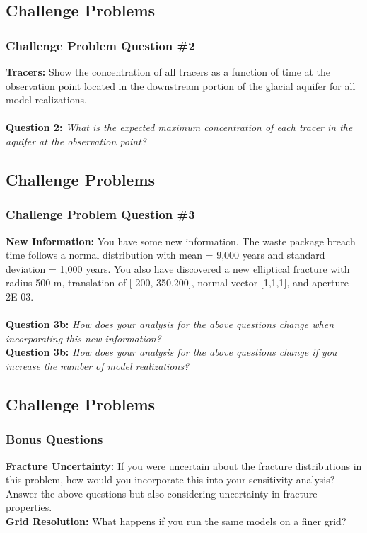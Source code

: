 \documentclass{beamer}
\begin{document}
\subsection{Challenge Problems}

\begin{frame}[fragile]\frametitle{Challenge Problem Question \#2}
	
	\textbf{Tracers:} Show the concentration of all tracers as a function of time at the observation point located in the downstream portion of the glacial aquifer for all model realizations.  \\
	\textbf{    }\\
	\textbf{Question 2: }\textit{What is the expected maximum concentration of each tracer in the aquifer at the observation point?}
	
\end{frame}

\subsection{Challenge Problems}

\begin{frame}[fragile]\frametitle{Challenge Problem Question \#3}
	\textbf{New Information:} You have some new information. The waste package breach time follows a normal distribution with mean = 9,000 years and standard deviation = 1,000 years. You also have discovered a new elliptical fracture with radius 500 m, translation of [-200,-350,200], normal vector [1,1,1], and aperture 2E-03.  \\
	\textbf{    }\\
	\textbf{Question 3b: }\textit{How does your analysis for the above questions change when incorporating this new information?}
	\textbf{    }\\
	\textbf{Question 3b: }\textit{How does your analysis for the above questions change if you increase the number of model realizations?}
\end{frame}

\subsection{Challenge Problems}

\begin{frame}[fragile]\frametitle{Bonus Questions}
	\textbf{Fracture Uncertainty:} If you were uncertain about the fracture distributions in this problem, how would you incorporate this into your sensitivity analysis? Answer the above questions but also considering uncertainty in fracture properties. \\
	\textbf{Grid Resolution:} What happens if you run the same models on a finer grid? \\
\end{frame}
\end{document}
